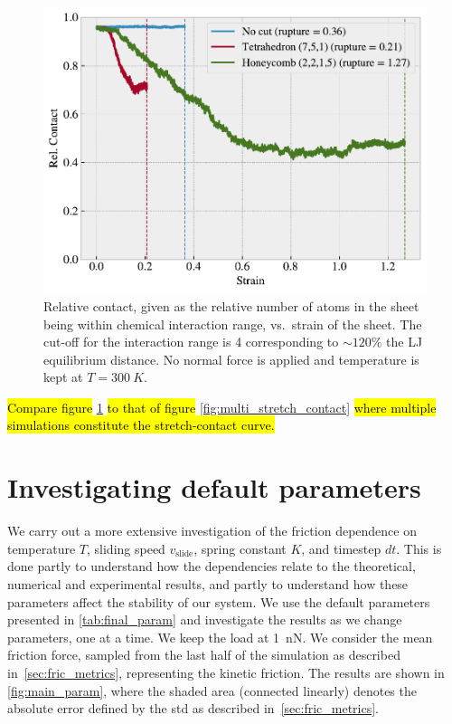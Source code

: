 \begin{figure}[H]
  \centering
  \includegraphics[width=0.6\linewidth]{figures/baseline/contact_vs_stretch.pdf}
  \caption{Relative contact, given as the relative number of atoms in the sheet being within chemical interaction range, vs.\ strain of the sheet.  The cut-off for the interaction range is \SI{4}{} corresponding to $\sim 120 \%$ the LJ equilibrium distance. No normal force is applied and temperature is kept at $T = \SI{300}{K}$.}
  \label{fig:contact_vs_stretch}
\end{figure}

\hl{Compare figure} \cref{fig:contact_vs_stretch} \hl{to that of figure} \cref{fig:multi_stretch_contact} \hl{where multiple simulations constitute the stretch-contact curve.}


\section{Investigating default parameters}\label{sec:main_params}
We carry out a more extensive investigation of the friction dependence on temperature $T$, sliding speed $v_{\text{slide}}$, spring
constant $K$, and timestep $dt$. This is done partly to
understand how the dependencies relate to the theoretical, numerical and
experimental results, and partly to understand how these parameters affect
the stability of our system. We use the default parameters presented in
\cref{tab:final_param} and investigate the results as we change parameters, one at a time. We keep the load at \SI{1}{nN}. We consider the mean
friction force, sampled from the last half of the simulation as described in~\cref{sec:fric_metrics}, representing the kinetic friction. The results are shown in \cref{fig:main_param}, where the shaded area (connected linearly) denotes the absolute error defined by the \acrshort{std} as described in~\cref{sec:fric_metrics}. 

